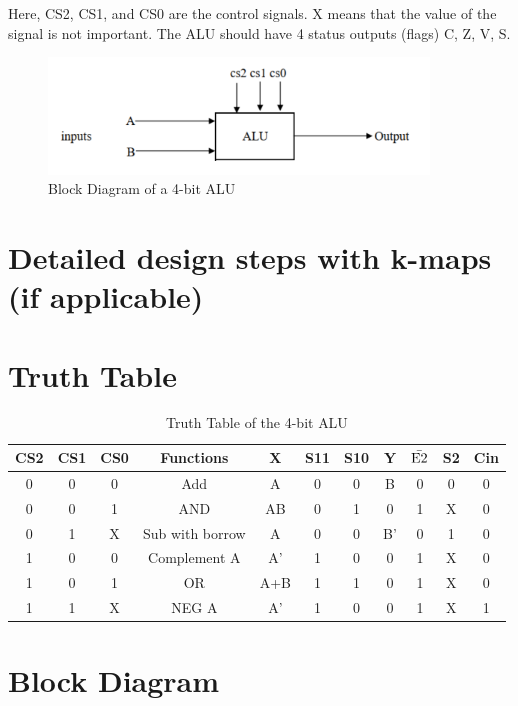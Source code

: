 \documentclass[11pt]{article}
\begin{document}
Here, CS2, CS1, and CS0 are the control signals. X means that the value of the signal is not important. The ALU should have 4 status outputs (flags) C, Z, V, S.
\begin{figure}[ht]
    \centering
    \includegraphics[width=0.9\textwidth]{images/ALU2.png}
    \caption{Block Diagram of a 4-bit ALU}
\end{figure}

\section{Detailed design steps with k-maps (if applicable)}

\section{Truth Table}
\begin{table}[ht]
    \centering
    \begin{tabular}{|c|c|c|c|c|c|c|c|c|c|c|}
        \hline
        CS2 & CS1 & CS0 & Functions & X & S11 & S10 & Y & $\bar{\textnormal{E2}}$ & S2 & Cin \\
        \hline
        0 & 0 & 0 & Add & A & 0 & 0 & B & 0 & 0 & 0 \\
        \hline
        0 & 0 & 1 & AND & AB & 0 & 1 & 0 & 1 & X & 0 \\
        \hline
        0 & 1 & X & Sub with borrow & A & 0 & 0 & B' & 0 & 1 & 0 \\
        \hline
        1 & 0 & 0 & Complement A & A' & 1 & 0 & 0 & 1 & X & 0 \\
        \hline
        1 & 0 & 1 & OR & A+B & 1 & 1 & 0 & 1 & X & 0 \\
        \hline
        1 & 1 & X & NEG A & A' & 1 & 0 & 0 & 1 & X & 1 \\
        \hline
    \end{tabular}
    \caption{Truth Table of the 4-bit ALU}
\end{table}

\section{Block Diagram}
\end{document}
